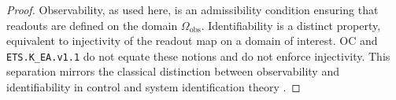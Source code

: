 \begin{proof}
Observability, as used here, is an admissibility condition ensuring that readouts
are defined on the domain \(\Omega_{\mathrm{obs}}\).
Identifiability is a distinct property, equivalent to injectivity of the readout
map on a domain of interest.
OC and \texttt{ETS.K\_EA.v1.1} do not equate these notions and do not enforce
injectivity.
This separation mirrors the classical distinction between observability and
identifiability in control and system identification theory
\cite{kalman1960,ljung1999}.
\end{proof}
